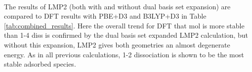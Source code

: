 \documentclass[11pt,DIV=13,BCOR=5mm,a4paper,headinclude]{scrbook}
\begin{document}
 \\
The results of LMP2 (both with and without dual basis set expansion) are compared to DFT results with PBE+D3 and B3LYP+D3 in Table \ref{tab:combined_results}.
Here the overall trend for DFT that mol is more stable than 1-4 diss is confirmed by the dual basis set expanded LMP2 calculation, but without this expansion, LMP2 gives both geometries an almost degenerate energy.
As in all previous calculations, 1-2 dissociation is shown to be the most stable  adsorbed species.
 
\end{document}

